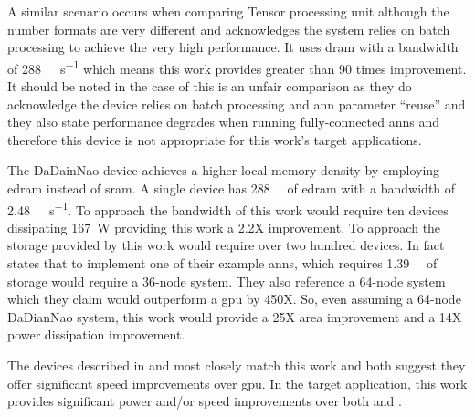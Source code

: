 A similar scenario occurs when comparing Tensor processing unit \cite{jouppi2017datacenter} although the number formats are very different and \cite{jouppi2017datacenter} acknowledges the system relies on batch processing to achieve the very high performance.
It uses \ac{dram} with a bandwidth of \SI[per-mode=symbol]{288}{\giga\bit\per\second} which means this work provides greater than 90 times improvement. 
It should be noted in the case of \cite{jouppi2017datacenter} this is an unfair comparison as they do acknowledge the device relies on batch processing and \ac{ann} parameter ``reuse'' and they also state performance degrades when running fully-connected \acp{ann} and therefore this device is not appropriate for this work's target applications.

The DaDainNao \cite{chen2016diannao} device achieves a higher local memory density by employing \ac{edram} instead of \ac{sram}. A single device has \SI[per-mode=symbol]{288}{\giga\bit} of \ac{edram} with a bandwidth of \SI[per-mode=symbol]{2.48}{\tera\bit\per\second}.
To approach the bandwidth of this work would require ten devices dissipating \SI[per-mode=symbol]{167}{\watt} providing this work a 2.2X improvement.
To approach the storage provided by this work would require over two hundred devices. 
In fact \cite{chen2016diannao} states that to implement one of their example \acp{ann}, which requires \SI[per-mode=symbol]{1.39}{\giga\byte} of storage would require a 36-node system. 
They also reference a 64-node system which they claim would outperform a \ac{gpu} by 450X.
So, even assuming a 64-node DaDianNao system, this work would provide a 25X area improvement and a 14X power dissipation improvement.

The devices described in \cite{chen2016diannao} and \cite{azarkhish2017neurostream} most closely match this work and both suggest they offer significant speed improvements over \ac{gpu}.
In the target application, this work provides significant power and/or speed improvements over both \cite{chen2016diannao} and \cite{azarkhish2017neurostream}.




